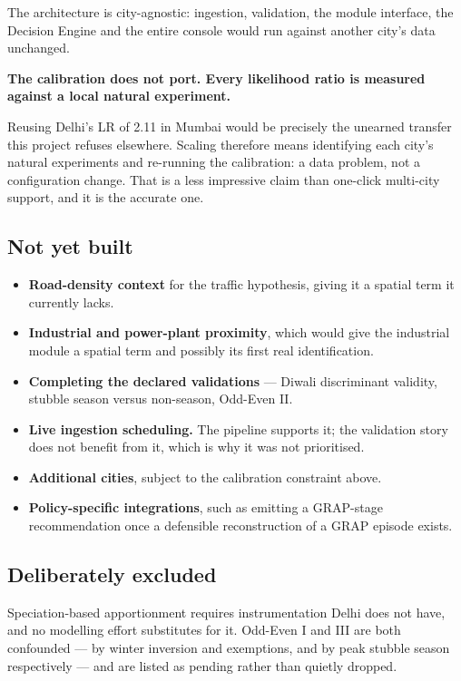 \documentclass[11pt,a4paper]{article}
\newcommand{\keyclaim}[1]{%
  \par\vspace{0.7ex}\noindent
  \colorbox{vwash}{\parbox{\dimexpr\linewidth-2\fboxsep}{%
    \color{vblack}\textbf{#1}}}%
  \par\vspace{0.9ex}}
\begin{document}
The architecture is city-agnostic: ingestion, validation, the module interface, the
Decision Engine and the entire console would run against another city's data
unchanged.

\keyclaim{The calibration does not port. Every likelihood ratio is measured against
a local natural experiment.}

Reusing Delhi's LR of 2.11 in Mumbai would be precisely the unearned transfer this
project refuses elsewhere. Scaling therefore means identifying each city's natural
experiments and re-running the calibration: a data problem, not a configuration
change. That is a less impressive claim than one-click multi-city support, and it is
the accurate one.

\subsection{Not yet built}

\begin{itemize}
  \item \textbf{Road-density context} for the traffic hypothesis, giving it a
  spatial term it currently lacks.
  \item \textbf{Industrial and power-plant proximity}, which would give the
  industrial module a spatial term and possibly its first real identification.
  \item \textbf{Completing the declared validations} --- Diwali discriminant
  validity, stubble season versus non-season, Odd-Even II.
  \item \textbf{Live ingestion scheduling.} The pipeline supports it; the validation
  story does not benefit from it, which is why it was not prioritised.
  \item \textbf{Additional cities}, subject to the calibration constraint above.
  \item \textbf{Policy-specific integrations}, such as emitting a GRAP-stage
  recommendation once a defensible reconstruction of a GRAP episode exists.
\end{itemize}

\subsection{Deliberately excluded}

Speciation-based apportionment requires instrumentation Delhi does not have, and no
modelling effort substitutes for it. Odd-Even I and III are both confounded --- by
winter inversion and exemptions, and by peak stubble season respectively --- and are
listed as pending rather than quietly dropped.
\end{document}
